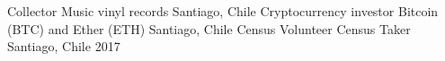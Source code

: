 \begin{cvhonors}
  \cvhonor
    {Collector}
    {Music vinyl records}
    {Santiago, Chile}
    {}
  \cvhonor
    {Cryptocurrency investor}
    {Bitcoin (BTC) and Ether (ETH)}
    {Santiago, Chile}
    {}
  \cvhonor
    {Census Volunteer}
    {Census Taker}
    {Santiago, Chile}
    {2017}
\end{cvhonors}

